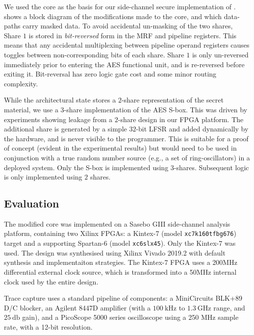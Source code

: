 We used the  core as the basis for our side-channel secure
implementation of .
 shows a block diagram of the modifications
made to the core, and which data-paths carry masked data.
To avoid accidental un-masking of the two shares,
Share $1$ is stored in {\em bit-reversed} form in the MRF and pipeline
registers.
This means that any accidental multiplexing between pipeline operand
registers causes toggles between non-corresponding bits of each share.
Share $1$ is only un-reversed immediately prior to entering the
AES functional unit, and is re-reversed before exiting it.
Bit-reversal has zero logic gate cost and some minor routing complexity.

While the architectural state stores a $2$-share representation
of the secret material, we use a $3$-share implementation of the
AES S-box.
This was driven by experiments showing 
leakage from a $2$-share design in our FPGA platform.
The additional share is generated by a simple $32$-bit LFSR and added
dynamically by the hardware, and is never visible to the programmer.
This is suitable for a proof of concept (evident in the experimental
results) but would need to be used in conjunction with a true random
number source (e.g., a set of ring-oscillators) in a deployed system.
Only the S-box is implemented using $3$-shares.
Subsequent  logic is only implemented using $2$ shares.

\subsection{Evaluation}

The modified  core was implemented on a
Sasebo GIII \cite{HKSS:12}
side-channel analysis platform, containing two Xilinx FPGAs:
a Kintex-7 
(model {\tt xc7k160tfbg676})
target
and
a supporting Spartan-6
(model {\tt xc6slx45}).
Only the Kintex-7 was used.
The design was synthesised using Xilinx Vivado 2019.2 with
default synthesis and implementaiton strategies.
The Kintex-7 FPGA uses a 200MHz differential external clock source, which is
transformed into a 50MHz internal clock used by the entire design.

Trace capture uses a standard pipeline of components:
a MiniCircuits BLK+89 D/C blocker,
an Agilent 8447D amplifier (with a $\SI{100}{\kilo\hertz}$ to $\SI{1.3}{\giga\hertz}$ range, and $\SI{25}{\decibel}$ gain),
and
a  PicoScope 5000 series oscilloscope using a
250 MHz sample rate, with a 12-bit resolution.

